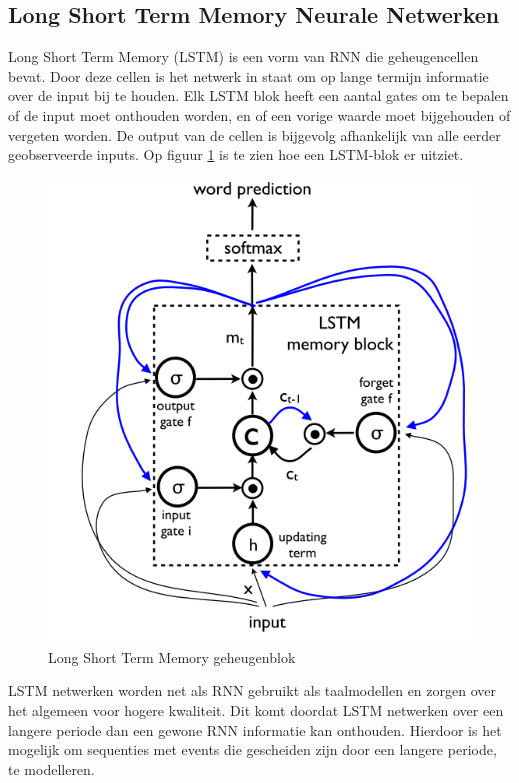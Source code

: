 \subsection{Long Short Term Memory Neurale Netwerken}
Long Short Term Memory (LSTM) is een vorm van RNN die geheugencellen bevat. Door deze cellen is het netwerk in staat om op lange termijn informatie over de input bij te houden. Elk LSTM blok heeft een aantal gates om te bepalen of de input moet onthouden worden, en of een vorige waarde moet bijgehouden of vergeten worden. De output van de cellen is bijgevolg afhankelijk van alle eerder geobserveerde inputs. Op figuur \ref{fig:lstm} is te zien hoe een LSTM-blok er uitziet.\cite{Google}\cite{SeppHochreiter1997}

\begin{figure}[tb]
    \centering
    \includegraphics[width=\linewidth]{Images/lstm.PNG}
    \caption{Long Short Term Memory geheugenblok}
    \label{fig:lstm}
\end{figure}

LSTM netwerken worden net als RNN gebruikt als taalmodellen en zorgen over het algemeen voor hogere kwaliteit. Dit komt doordat LSTM netwerken over een langere periode dan een gewone RNN informatie kan onthouden. Hierdoor is het mogelijk om sequenties met events die gescheiden zijn door een langere periode, te modelleren.


